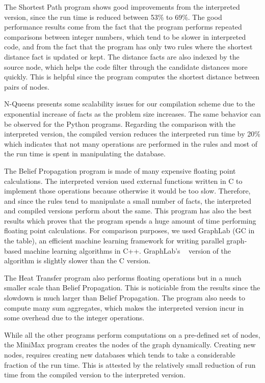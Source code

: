 The Shortest Path program shows good improvements from the interpreted version,
since the run time is reduced between 53\% to 69\%.  The good performance results
come from the fact that the program performs repeated comparisons between
integer numbers, which tend to be slower in interpreted code, and from the fact
that the program has only two rules where the shortest distance fact is updated
or kept.  The distance facts are also indexed by the source node, which helps
the code filter through the candidate distances more quickly. This is helpful
since the program computes the shortest distance between pairs of nodes.

N-Queens presents some scalability issues for our compilation scheme due to the
exponential increase of facts as the problem size increases.  The same behavior
can be observed for the Python programs. Regarding the comparison with the
interpreted version, the compiled version reduces the interpreted run time by
20\% which indicates that not many operations are performed in the rules and
most of the run time is spent in manipulating the database.

The Belief Propagation program is made of many expensive floating point
calculations. The interpreted version used external functions written in C to
implement those operations because otherwise it would be too slow. Therefore,
and since the rules tend to manipulate a small number of facts, the interpreted
and compiled versions perform about the same. This program has also the best
results which proves that the program spends a huge amount of time performing
floating point calculations. For comparison purposes, we used GraphLab (GC in
the table), an efficient machine learning framework for writing parallel
graph-based machine learning algorithms in C++.  GraphLab's ~\cite{GraphLab2010}
version of the algorithm is slightly slower than the C version.

The Heat Transfer program also performs floating operations but in a much
smaller scale than Belief Propagation. This is noticiable from the results since
the slowdown is much larger than Belief Propagation. The program also needs to
compute many sum aggregates, which makes the interpreted version incur in some
overhead due to the integer operations.

While all the other programs perform computations on a pre-defined set of nodes,
the MiniMax program creates the nodes of the graph dynamically.  Creating new
nodes, requires creating new databases which tends to take a considerable
fraction of the run time. This is attested by the relatively small reduction of
run time from the compiled version to the interpreted version.

